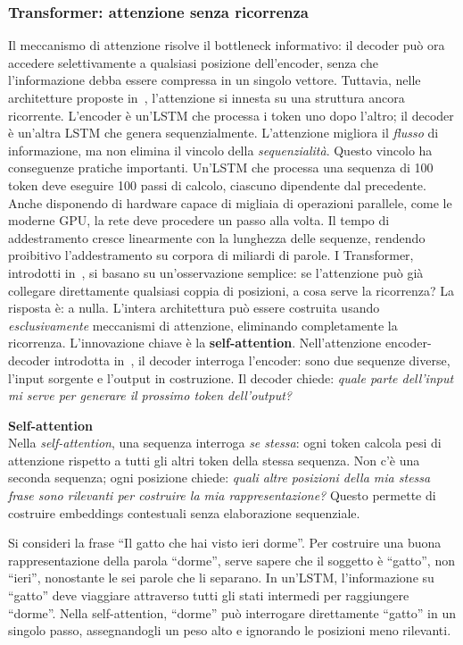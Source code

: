 \subsubsection{Transformer: attenzione senza ricorrenza}
\label{subsubsec:transformer}
Il meccanismo di attenzione risolve il bottleneck informativo: il decoder può ora accedere selettivamente a qualsiasi posizione dell'encoder, senza che l'informazione debba essere compressa in un singolo vettore. Tuttavia, nelle architetture proposte in~\parencite{bahdanau2014neural}, l'attenzione si innesta su una struttura ancora ricorrente. L'encoder è un'LSTM che processa i token uno dopo l'altro; il decoder è un'altra LSTM che genera sequenzialmente. L'attenzione migliora il \textit{flusso} di informazione, ma non elimina il vincolo della \textit{sequenzialità}.
Questo vincolo ha conseguenze pratiche importanti. Un'LSTM che processa una sequenza di 100 token deve eseguire 100 passi di calcolo, ciascuno dipendente dal precedente. Anche disponendo di hardware capace di migliaia di operazioni parallele, come le moderne GPU, la rete deve procedere un passo alla volta. Il tempo di addestramento cresce linearmente con la lunghezza delle sequenze, rendendo proibitivo l'addestramento su corpora di miliardi di parole.
I Transformer, introdotti in~\parencite{vaswani2017attention}, si basano su un'osservazione semplice: se l'attenzione può già collegare direttamente qualsiasi coppia di posizioni, a cosa serve la ricorrenza? La risposta è: a nulla. L'intera architettura può essere costruita usando \textit{esclusivamente} meccanismi di attenzione, eliminando completamente la ricorrenza.
L'innovazione chiave è la \textbf{self-attention}. Nell'attenzione encoder-decoder introdotta in~\parencite{bahdanau2014neural}, il decoder interroga l'encoder: sono due sequenze diverse, l'input sorgente e l'output in costruzione. Il decoder chiede: \textit{quale parte dell'input mi serve per generare il prossimo token dell'output?}
\begin{notebox}
\textbf{Self-attention}\\
Nella \textit{self-attention}, una sequenza interroga \textit{se stessa}: ogni token calcola pesi di attenzione rispetto a tutti gli altri token della stessa sequenza. Non c'è una seconda sequenza; ogni posizione chiede: \textit{quali altre posizioni della mia stessa frase sono rilevanti per costruire la mia rappresentazione?} Questo permette di costruire embeddings contestuali senza elaborazione sequenziale.
\end{notebox}
Si consideri la frase ``Il gatto che hai visto ieri dorme''. Per costruire una buona rappresentazione della parola ``dorme'', serve sapere che il soggetto è ``gatto'', non ``ieri'', nonostante le sei parole che li separano. In un'LSTM, l'informazione su ``gatto'' deve viaggiare attraverso tutti gli stati intermedi per raggiungere ``dorme''. Nella self-attention, ``dorme'' può interrogare direttamente ``gatto'' in un singolo passo, assegnandogli un peso alto e ignorando le posizioni meno rilevanti.
